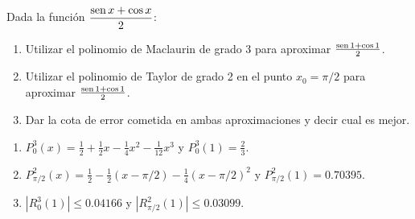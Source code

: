 {Dada la función $\dfrac{\operatorname{sen} x+\cos x}{2}$:
\begin{enumerate}
\item  Utilizar el polinomio de Maclaurin de grado 3 para aproximar $\frac{\operatorname{sen} 1+\cos 1}{2}$.
\item  Utilizar el polinomio de Taylor de grado 2 en el punto $x_0 = \pi/2$ para aproximar $\frac{\operatorname{sen} 1+\cos 1}{2}$.
\item  Dar la cota de error cometida en ambas aproximaciones y decir cual es mejor.
\end{enumerate}
}
{\begin{enumerate}
\item $P_0^3(x)=\frac{1}{2}+\frac{1}{2}x-\frac{1}{4}x^2-\frac{1}{12}x^3$ y $P_0^3(1)=\frac{2}{3}$.
\item $P_{\pi/2}^2(x)=\frac{1}{2}-\frac{1}{2}(x-\pi/2)-\frac{1}{4}(x-\pi/2)^2$ y  $P_{\pi/2}^2(1)= 0.70395$.
\item $|R_0^3(1)|\leq 0.04166$ y $|R_{\pi/2}^2(1)|\leq 0.03099$.
\end{enumerate}
}
